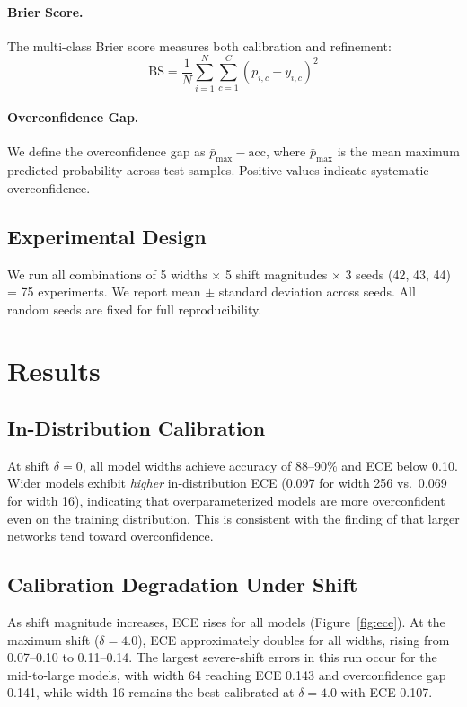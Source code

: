 \documentclass[11pt,a4paper]{article}
\begin{document}
\paragraph{Brier Score.}
The multi-class Brier score measures both calibration and refinement:
\begin{equation}
    \text{BS} = \frac{1}{N} \sum_{i=1}^{N} \sum_{c=1}^{C} (p_{i,c} - y_{i,c})^2
\end{equation}

\paragraph{Overconfidence Gap.}
We define the overconfidence gap as $\bar{p}_{\max} - \text{acc}$, where $\bar{p}_{\max}$ is the mean maximum predicted probability across test samples.
Positive values indicate systematic overconfidence.

\subsection{Experimental Design}

We run all combinations of 5 widths $\times$ 5 shift magnitudes $\times$ 3 seeds (42, 43, 44) = 75 experiments.
We report mean $\pm$ standard deviation across seeds.
All random seeds are fixed for full reproducibility.

\section{Results}

\subsection{In-Distribution Calibration}

At shift $\delta = 0$, all model widths achieve accuracy of 88--90\% and ECE below 0.10.
Wider models exhibit \emph{higher} in-distribution ECE (0.097 for width 256 vs.\ 0.069 for width 16), indicating that overparameterized models are more overconfident even on the training distribution.
This is consistent with the finding of \citet{guo2017calibration} that larger networks tend toward overconfidence.

\subsection{Calibration Degradation Under Shift}

As shift magnitude increases, ECE rises for all models (Figure~\ref{fig:ece}).
At the maximum shift ($\delta = 4.0$), ECE approximately doubles for all widths, rising from 0.07--0.10 to 0.11--0.14.
The largest severe-shift errors in this run occur for the mid-to-large models, with width 64 reaching ECE 0.143 and overconfidence gap 0.141, while width 16 remains the best calibrated at $\delta = 4.0$ with ECE 0.107.
\end{document}
